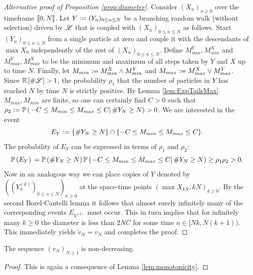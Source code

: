 \begin{proof}[Alternative proof of Proposition \ref{prop:diameter}]
Consider $(X_n)_{n \geq 0}$ over the timeframe $\llbracket0, N\rrbracket$. Let $Y \vcentcolon= (Y_n)_{0 \leq n \leq N}$ be a branching random walk (without selection) driven by $\mathscr{L}$ that is coupled with $(X_n)_{0 \leq n \leq N}$ as follows. Start $(Y_n)_{0 \leq n \leq N}$ from a single particle at zero and couple it with the descendants of $\max X_0$ independently of the rest of $(X_n)_{0 \leq n \leq N}$. Define $M^Y_{min}, M^X_{min}$ and $M^Y_{max}, M^X_{max}$ to be the minimum and maximum of all steps taken by $Y$ and $X$ up to time $N$. Finally, let $M_{min} \vcentcolon= M^X_{min} \land M^Y_{min}$ and $M_{max} \vcentcolon= M^X_{max} \lor M^Y_{max}$. Since $\mathbb{E}\left[ \# \mathscr{L} \right] > 1$, the probability $\rho_1$ that the number of particles in $Y$ has reached $N$ by time $N$ is strictly positive. By Lemma \ref{lem:ExpTailsMax} $M_{max}, M_{min}$ are finite, so one can certainly find $C > 0$ such that $\rho_2 \vcentcolon= \mathbb{P} \left( \left. -C \leq M_{min} \leq M_{max} \leq C  \right| \# Y_N \geq N \right) > 0$. We are interested in the event
\begin{equation}\nonumber
E_Y \vcentcolon= \{ \# Y_N \geq N \} \cap \{-C \leq M_{min} \leq M_{max} \leq C \}. 
\end{equation}
The probability of $E_Y$ can be expressed in terms of $\rho_1$ and $\rho_2$:
\begin{equation}\nonumber
\mathbb{P} \left( E_Y \right) \\
= \mathbb{P} \left( \# Y_N \geq N \right) \mathbb{P} \left( \left. -C \leq M_{min} \leq M_{max} \leq C  \right| \# Y_N \geq N \right) \geq \rho_1 \rho_2 > 0.
\end{equation}
Now in an analogous way we can place copies of $Y$ denoted by $((Y^{(k)}_n)_{0 \leq n \leq N})_{k \geq 0}$ at the space-time points $(\max X_{kN}, kN)_{k \geq 0}$. By the second Borel-Cantelli lemma it follows that almost surely infinitely many of the corresponding events $E_{Y^{(k)}}$ must occur. This in turn implies that for infinitely many $k \geq 0$ the diameter is less than $2NC$ for some time $n \in [Nk, N(k+1))$. This immediately yields $\tilde{v}_N = v_N$ and completes the proof. 
\end{proof}

\begin{proposition}\label{prop:increasing_speed}
The sequence $(v_N)_{N \geq 1}$ is non-decreasing. 
\end{proposition}
\begin{proof}
This is again a consequence of Lemma \ref{lem:monotonicity}. 
\end{proof}




